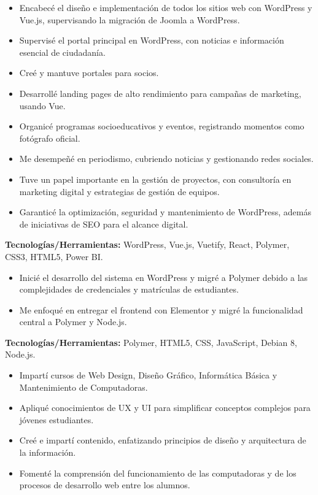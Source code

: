 \documentclass[10pt,a4paper]{altacv}
\begin{document}
\begin{itemize}
    \setlength{\itemindent}{0.5em}
    \item[--] Encabecé el diseño e implementación de todos los sitios web con WordPress y Vue.js, supervisando la migración de Joomla a WordPress.
    \item[--] Supervisé el portal principal en WordPress, con noticias e información esencial de ciudadanía.
    \item[--] Creé y mantuve portales para socios.
    \item[--] Desarrollé landing pages de alto rendimiento para campañas de marketing, usando Vue.
    \item[--] Organicé programas socioeducativos y eventos, registrando momentos como fotógrafo oficial.
    \item[--] Me desempeñé en periodismo, cubriendo noticias y gestionando redes sociales.
    \item[--] Tuve un papel importante en la gestión de proyectos, con consultoría en marketing digital y estrategias de gestión de equipos.
    \item[--] Garanticé la optimización, seguridad y mantenimiento de WordPress, además de iniciativas de SEO para el alcance digital.
\end{itemize}
\textbf{Tecnologías/Herramientas:} WordPress, Vue.js, Vuetify, React, Polymer, CSS3, HTML5, Power BI.
\vspace{5mm}

\begin{itemize}
    \setlength{\itemindent}{0.5em}
    \item[--] Inicié el desarrollo del sistema en WordPress y migré a Polymer debido a las complejidades de credenciales y matrículas de estudiantes.
    \item[--] Me enfoqué en entregar el frontend con Elementor y migré la funcionalidad central a Polymer y Node.js.
\end{itemize}
\textbf{Tecnologías/Herramientas:} Polymer, HTML5, CSS, JavaScript, Debian 8, Node.js.
\vspace{5mm}

\begin{itemize}
    \setlength{\itemindent}{0.5em}
    \item[--] Impartí cursos de Web Design, Diseño Gráfico, Informática Básica y Mantenimiento de Computadoras.
    \item[--] Apliqué conocimientos de UX y UI para simplificar conceptos complejos para jóvenes estudiantes.
    \item[--] Creé e impartí contenido, enfatizando principios de diseño y arquitectura de la información.
    \item[--] Fomenté la comprensión del funcionamiento de las computadoras y de los procesos de desarrollo web entre los alumnos.
\end{itemize}
\end{document}
